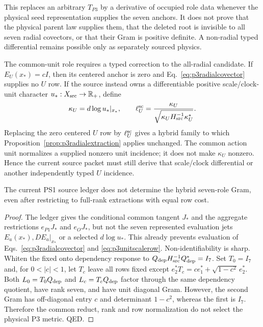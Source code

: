 This replaces an arbitrary $T_{P3}$ by a derivative of occupied role data
whenever the physical seed representation supplies the seven anchors.  It
does not prove that the physical parent law supplies them, that the deleted root is invisible
to all seven radial covectors, or that their Gram is positive definite.  A
non-radial typed differential remains possible only as separately sourced
physics.

The common-unit role requires a typed correction to the all-radial candidate.
If $E_U(x_*)=cI$, then its centered anchor is zero and
Eq.~\eqref{eq:p3radialcovector} supplies no $U$ row.  If the source instead
owns a differentiable positive scale/clock-unit character
$u_*:X_{\rm src}\to\mathbb R_+$, define
\begin{equation}
\kappa_U=d\log u_*|_{x_*},
\qquad
\ell_U^{\rm sc}={\kappa_U\over
\sqrt{\kappa_UH_{\rm src}^{-1}\kappa_U^*}}.
\label{eq:p3unitscalerow}
\end{equation}
Replacing the zero centered $U$ row by $\ell_U^{\rm sc}$ gives a hybrid
family to which Proposition~\ref{prop:p3radialextraction} applies unchanged.
The common action unit normalizes a supplied nonzero unit incidence; it does
not make $\kappa_U$ nonzero.  Hence the current source packet must still
derive that scale/clock differential or another independently typed $U$
incidence.

\begin{proposition}
\label{prop:p3currentevaluability}
The current PS1 source ledger does not determine the hybrid seven-role Gram,
even after restricting to full-rank extractions with equal row cost.
\end{proposition}

\begin{proof}
The ledger gives the conditional common tangent $J_*$ and the aggregate
restrictions $e_{P1}J_*$ and $e_OJ_*$, but not the seven represented
evaluation jets $E_a(x_*),DE_a|_{x_*}$ or a selected $d\log u_*$.  This
already prevents evaluation of Eqs.~\eqref{eq:p3radialcovector} and
\eqref{eq:p3unitscalerow}.  Non-identifiability is sharp.  Whiten the fixed
onto dependency response to
$Q_{\rm dep}H_{\rm src}^{-1}Q_{\rm dep}^*=I_7$.  Set $T_0=I_7$ and, for
$0<|c|<1$, let $T_c$ leave all rows fixed except
$e_2^*T_c=ce_1^*+\sqrt{1-c^2}\,e_2^*$.  Both
$L_0=T_0Q_{\rm dep}$ and $L_c=T_cQ_{\rm dep}$ factor through the same
dependency quotient, have rank seven, and have unit diagonal Gram.  However,
the second Gram has off-diagonal entry $c$ and determinant $1-c^2$, whereas
the first is $I_7$.  Therefore the common reduct, rank and row normalization
do not select the physical P3 metric.  QED.
\end{proof}

